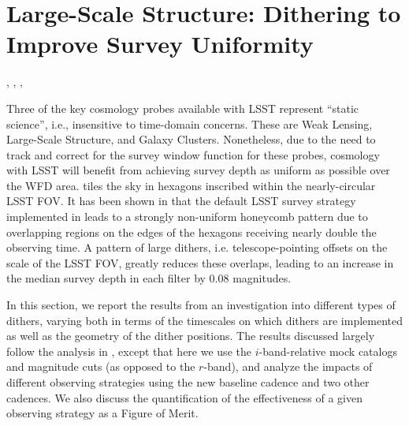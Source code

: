%
%
%
\newcommand{\sigmaOS}[0]{$\sigma_{\mathrm{C_{\ell, {OS}}}}$}
\newcommand{\CellOS}[0]{$C_{\ell, \rm{OS}}$}
\newcommand{\statFloor}[0]{$\Delta C_\ell$}
\newcommand{\delobs}[0]{\delta_{\mathrm{obs},i}}
\newcommand{\dellss}[0]{\delta_{\mathrm{LSS},i}}
\newcommand{\delos}[0]{\delta_{\mathrm{OS},i}}
\newcommand{\ev}[1]{\left < {#1} \right >}

\section{Large-Scale Structure: Dithering to Improve Survey Uniformity}
\def\secname{lss}\label{sec:\secname}

,
,
,

Three of the key cosmology probes available with LSST represent ``static science'', i.e., insensitive to time-domain concerns.  These are Weak Lensing, Large-Scale Structure, and Galaxy Clusters.  Nonetheless, due to the need to track and correct for the survey window function for these probes, cosmology with LSST will benefit from achieving survey depth as uniform as possible over the WFD area.  \OpSim tiles the sky in hexagons inscribed within the nearly-circular LSST FOV. It has been shown in \citet{CarrollEtal2014} that the default LSST survey strategy implemented in \OpSim leads to a strongly non-uniform honeycomb pattern due to overlapping regions on the edges of the hexagons receiving nearly double the observing time.  A pattern of large dithers, i.e. telescope-pointing offsets on the scale of the LSST FOV, greatly reduces these overlaps, leading to an increase in the median survey depth in each filter by 0.08 magnitudes.

In this section, we report the results from an investigation into different types of dithers, varying both in terms of the timescales on which dithers are implemented as well as the geometry of the dither positions. The results discussed largely follow the analysis in \citet{AwanEtal2016}, except that here we use the $i$-band-relative mock catalogs and magnitude cuts (as opposed to the $r$-band), and analyze the impacts of different observing strategies using the new baseline cadence  and two other cadences. We also discuss the quantification of the effectiveness of a given observing strategy as a Figure of Merit.

